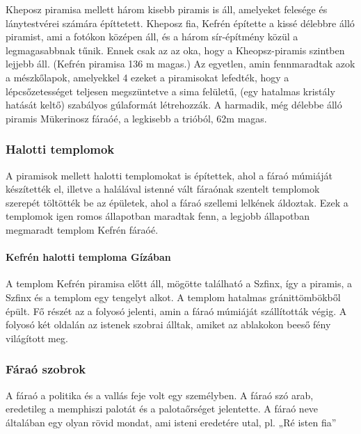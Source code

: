 \begin{figure}
\end{figure}

Kheposz piramisa mellett három kisebb piramis is áll, amelyeket felesége és lánytestvérei számára építtetett.
Kheposz fia, Kefrén építette a kissé délebbre álló piramist, ami a fotókon középen áll, és
a három sír-építmény közül a legmagasabbnak tűnik. Ennek csak az az oka, hogy a Kheopsz-piramis szintben lejjebb áll. (Kefrén piramisa 136 m magas.) Az egyetlen, amin fennmaradtak azok a mészkőlapok, amelyekkel
4
ezeket a piramisokat lefedték, hogy a lépcsőzetességet teljesen megszüntetve a sima felületű, (egy hatalmas kristály hatását keltő) szabályos gúlaformát létrehozzák.
A harmadik, még délebbe álló piramis Mükerinosz fáraóé, a legkisebb a trióból, 62m magas.

\subsubsection*{Halotti templomok}

A piramisok mellett halotti templomokat is építettek, ahol a fáraó múmiáját készítették el, illetve a halálával istenné vált fáraónak szentelt templomok szerepét töltötték be az épületek, ahol a fáraó szellemi lelkének áldoztak. Ezek a templomok igen romos állapotban maradtak fenn, a legjobb állapotban megmaradt templom Kefrén fáraóé.

\paragraph{Kefrén halotti temploma Gízában}
A templom Kefrén piramisa előtt áll, mögötte található a Szfinx, így a piramis, a Szfinx és a templom egy tengelyt alkot. A templom hatalmas gránittömbökből épült. Fő részét az a folyosó jelenti, amin a fáraó múmiáját szállították végig. A folyosó két oldalán az istenek szobrai álltak, amiket az ablakokon beeső fény világított meg.

\subsubsection*{Fáraó szobrok}

A fáraó a politika és a vallás feje volt egy személyben. A fáraó szó arab, eredetileg a memphiszi palotát és a palotaőrséget jelentette. A fáraó neve általában egy olyan rövid mondat, ami isteni eredetére utal, pl. „Ré isten fia”

